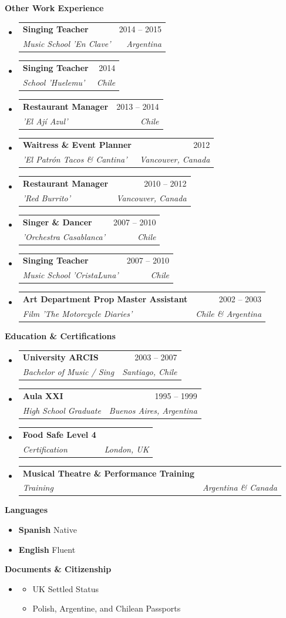 \documentclass[letterpaper,12pt]{article}[leftmargin=*]
\makeatletter
\def \entryspacing {-0pt}
\renewcommand{\section}[2]{\vspace{5pt}
  \colorbox{secondary}{\color{white}\raggedbottom\normalsize\textbf{{#1}{\hspace{7pt}#2}}}
}
\newcommand{\resumeEntryStart}{\begin{itemize}[leftmargin=2.5mm]}
\newcommand{\resumeEntryEnd}{\end{itemize}\vspace{\entryspacing}}
\newcommand{\resumeItemListStart}{\begin{itemize}[leftmargin=*,itemsep=0pt]}
\newcommand{\resumeItemListEnd}{\end{itemize}}
\newcommand{\resumeItem}[1]{
  \item\small{
    {#1 \vspace{-2pt}}
  }
}
\newcommand{\resumeEntryTSDL}[4]{
  \vspace{-1pt}\item[]
    \begin{tabularx}{0.97\textwidth}{X@{\hspace{60pt}}r}
      \textbf{\color{primary}#1} & {\firabook\color{accent}\small#2} \\
      \textit{\color{accent}\small#3} & \textit{\color{accent}\small#4} \\
    \end{tabularx}\vspace{-6pt}
}
\newcommand{\resumeEntryS}[2]{
  \item[]\small{
    \textbf{\color{primary}#1 }{ #2 \vspace{-6pt}}
  }
}
\makeatother
\begin{document}
\section{\faFlask}{Other Work Experience}

  \resumeEntryStart
    \resumeEntryTSDL
      {Singing Teacher}{2014 -- 2015}
      {Music School 'En Clave'}{Argentina}
    \resumeEntryTSDL
      {Singing Teacher}{2014}
      {School 'Huelemu'}{Chile}
    \resumeEntryTSDL
      {Restaurant Manager}{2013 -- 2014}
      {'El Ají Azul'}{Chile}
    \resumeEntryTSDL
      {Waitress \& Event Planner}{2012}
      {'El Patrón Tacos \& Cantina'}{Vancouver, Canada}
    \resumeEntryTSDL
      {Restaurant Manager}{2010 -- 2012}
      {'Red Burrito'}{Vancouver, Canada}
    \resumeEntryTSDL
      {Singer \& Dancer}{2007 -- 2010}
      {'Orchestra Casablanca'}{Chile}
    \resumeEntryTSDL
      {Singing Teacher}{2007 -- 2010}
      {Music School 'CristaLuna'}{Chile}
    \resumeEntryTSDL
      {Art Department Prop Master Assistant}{2002 -- 2003}
      {Film 'The Motorcycle Diaries'}{Chile \& Argentina}
  \resumeEntryEnd

\section{\faGraduationCap}{Education \& Certifications}

  \resumeEntryStart
    \resumeEntryTSDL
      {University ARCIS}{2003 -- 2007}
      {Bachelor of Music / Sing}{Santiago, Chile}
    \resumeEntryTSDL
      {Aula XXI}{1995 -- 1999}
      {High School Graduate}{Buenos Aires, Argentina}
    \resumeEntryTSDL
      {Food Safe Level 4}{}
      {Certification}{London, UK}
    \resumeEntryTSDL
      {Musical Theatre \& Performance Training}{}
      {Training}{Argentina \& Canada}
  \resumeEntryEnd

\section{}{Languages}
 \resumeEntryStart
  \resumeEntryS{Spanish}{Native}
  \resumeEntryS{English}{Fluent}
 \resumeEntryEnd

\section{}{Documents \& Citizenship}
 \resumeEntryStart
    \resumeEntryS{ }{ }
    \vspace{-20pt}
    \resumeItemListStart
        \resumeItem{UK Settled Status}
        \resumeItem{Polish, Argentine, and Chilean Passports}
    \resumeItemListEnd
 \resumeEntryEnd

\end{document}
